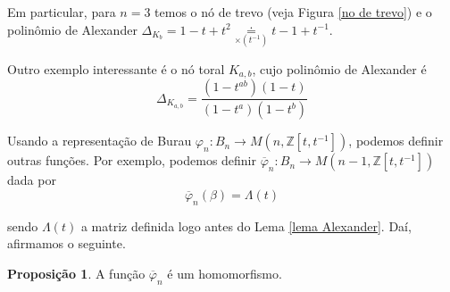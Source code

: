 \documentclass[a4paper,portuguese,11pt,twoside, leqno]{book}
\theoremstyle{definition}
\newtheorem{prop}{Proposição}[section]
\begin{document}
	\par\vspace{0.3cm} Em particular, para $n = 3$ temos o nó de trevo (veja Figura \eqref{no de trevo}) e o polinômio de Alexander $\Delta_{K_b} = 1-t+t^2\underset{\times(t^{-1})}{\doteq} t-1+t^{-1}$.
	\par\vspace{0.3cm} Outro exemplo interessante é o nó toral $K_{a,b}$, cujo polinômio de Alexander é
	\begin{equation*}
	\Delta_{K_{a,b}} = \frac{(1-t^{ab})(1-t)}{(1-t^a)(1-t^b)}
	\end{equation*}
	\par\vspace{0.3cm} Usando a representação de Burau $\varphi_n: B_n\to M(n, \mathbb{Z}[t,t^{-1}])$, podemos definir outras funções. Por exemplo, podemos definir $\overline{\varphi}_n: B_n\to M(n-1, \mathbb{Z}[t,t^{-1}])$ dada por
	\begin{equation*}
	\overline{\varphi}_n(\beta) = \Lambda(t)
	\end{equation*} 
	\par\vspace{0.3cm} sendo $\Lambda(t)$ a matriz definida logo antes do Lema \eqref{lema Alexander}. Daí, afirmamos o seguinte.
	\begin{prop}
		\label{parecido com Burau}
		A função $\overline{\varphi}_n$ é um homomorfismo. %
	\end{prop}
\end{document}
